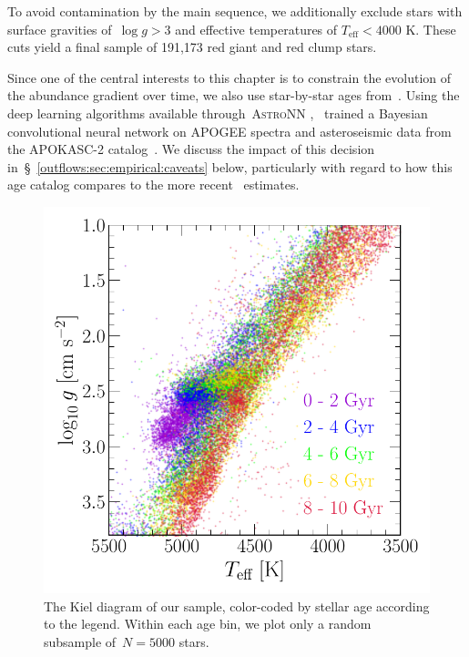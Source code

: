 To avoid contamination by the main sequence, we additionally exclude stars
with surface gravities of~$\log g > 3$ and effective temperatures of
$T_\text{eff} < 4000$ K.
These cuts yield a final sample of 191,173 red giant and red clump stars.
\par
Since one of the central interests to this chapter is to constrain the
evolution of the abundance gradient over time, we also use star-by-star ages
from~\citet{Mackereth2019b}.
Using the deep learning algorithms available through~\textsc{AstroNN}
\citep{Leung2019},~\citet{Mackereth2019b} trained a Bayesian convolutional
neural network on APOGEE spectra and asteroseismic data from the APOKASC-2
catalog~\citep{Pinsonneault2018}.
We discuss the impact of this decision
in~\S~\ref{outflows:sec:empirical:caveats} below, particularly with regard to
how this age catalog compares to the more recent~\citet{Leung2023} estimates.

\begin{figure}
\centering
\includegraphics[scale = 0.6]{kiel_diagram.pdf}
\caption{
The Kiel diagram of our sample, color-coded by stellar age according to the
legend.
Within each age bin, we plot only a random subsample of~$N = 5000$ stars.
}
\label{outflows:fig:kiel-diagram}
\end{figure}

